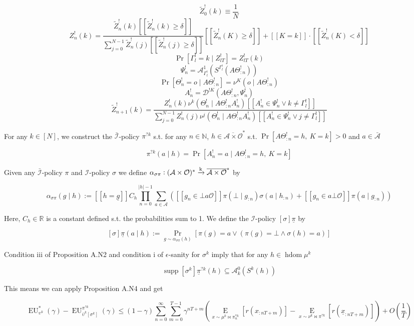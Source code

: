 \documentclass[a4paper]{article}
\DeclareMathOperator{\Supp}{supp}
\newcommand{\E}[1]{\underset{#1}{\operatorname{E}}}
\newcommand{\Nats}{\mathbb{N}}
\newcommand{\Reals}{\mathbb{R}}
\newcommand{\Abs}[1]{\lvert #1 \rvert}
\newcommand{\M}{\xrightarrow{\textnormal{k}}}
\newcommand{\Ob}{\mathcal{O}}
\newcommand{\A}{\mathcal{A}}
\newcommand{\In}{\mathcal{I}}
\newcommand{\FH}{(\A \times \Ob)^*}
\newcommand{\Ada}{\bar{\A}}
\newcommand{\Adi}{{\bar{\In}}}
\newcommand{\Adao}{\overline{\A \times \Ob}}
\newcommand{\Adfh}{\Adao^*}
\DeclareMathOperator{\HD}{hdom}
\newcommand{\EU}{\operatorname{EU}}
\newcommand{\D}{\mathcal{D}}
\newcommand{\Z}{Z}
\begin{document}
$$\tilde{\Z}^!_0(k)\equiv\frac{1}{N}$$
%
$$\Z_{n}^!(k) = \frac{\tilde{\Z}^!_{n}(k)[[\tilde{\Z}^!_{n}(k) \geq \delta]] }{\sum_{j = 0}^{N-1}\tilde{\Z}^!_{n}(j)[[\tilde{\Z}^!_{n}(j) \geq \delta]]}[[\tilde{\Z}^!_{n}(K) \geq \delta]] + [[K = k]]\cdot [[\tilde{\Z}^!_{n}(K) < \delta]]$$
%
$$\Pr\left[\Gamma^!_{l} = k \mid Z^!_{lT}\right] = \Z^!_{lT}\left(k\right)$$
%
$$\Psi^!_{n} = \A^1_{\Gamma^!_l}\left(S^{\Gamma^!_l}(A\Theta^!_{:n})\right)$$
%
$$\Pr\left[\Theta^!_{n} = o \mid A\Theta^!_{:n}\right] = \nu^K\left(o \mid A\Theta^!_{:n}\right)$$
%
$$A^!_n = \D^{!K}\left(A\Theta^!_{:n}, \Psi^!_n\right)$$
%
$$\tilde{\Z}^!_{n+1}(k)=\frac{\Z^!_{n}(k) \nu^k\left(\Theta^!_{n} \mid A\Theta^!_{:n}A_{n}^!\right)[[A^!_{n} \in \Psi^!_{n} \lor k \ne \Gamma^!_l]]}{\sum_{j = 0}^{N-1} \Z^!_n(j) \nu^j(\Theta^!_n \mid A\Theta^!_{:n}A^!_n)[[A^!_{n} \in \Psi^!_{n} \lor j \ne \Gamma^!_l]]}$$

For any $k \in [N]$, we construct the $\Adi$-policy $\pi^{?k}$ s.t. for any $n \in \Nats$, $h \in \Adfh$ s.t. $\Pr\left[A\Theta^!_{:n}=h,\ K = k\right] > 0$ and $a \in \Ada$

$$\pi^{?k}(a \mid h)=\Pr\left[A^!_n = a \mid A\Theta^!_{:n} = h,\ K = k\right]$$

Given any $\Adi$-policy $\pi$ and $\In$-policy $\sigma$ we define $\alpha_{\sigma\pi}: \FH \M \Adfh$ by

$$\alpha_{\sigma\pi} (g \mid h) := [[h = \underline{g}]]C_h\prod_{n = 0}^{\Abs{h}-1} \sum_{a \in \A}\left([[g_n \in \bot a\Ob]] \pi\left(\bot \mid g_{:n}\right)\sigma\left(a \mid h_{:n}\right)+[[g_n \in a\bot\Ob]]\pi\left(a \mid g_{:n}\right)\right)$$

Here, $C_h \in \Reals$ is a constant defined s.t. the probabilities sum to 1. We define the $\In$-policy $\left[\sigma\right]\underline{\pi}$ by

$$\left[\sigma\right]\underline{\pi}(a \mid h):=\Pr_{g \sim \alpha_{\sigma\pi}(h)}\left[\pi\left(g\right)=a \lor \left(\pi\left(g\right)=\bot \land \sigma(h)=a\right)\right]$$

Condition iii of Proposition A.N2 and condition i of $\epsilon$-sanity for $\sigma^k$ imply that for any $h \in \HD{\mu^k}$

$$\Supp{\left[\sigma^k\right]\underline{\pi}^{?k}(h)} \subseteq \A^0_k\left(S^k\left(h\right)\right)$$

This means we can apply Proposition A.N4 and get

$$\EU^*_{\upsilon^k}(\gamma)-\EU^{\pi^{?k}}_{\bar{\upsilon}^k[\sigma^k]}(\gamma) \leq (1-\gamma)\sum_{n=0}^\infty \sum_{m=0}^{T-1} \gamma^{nT+m}\left(\E{x\sim\mu^k\bowtie\pi^{*k}_n}\left[r\left(x_{:nT+m}\right)\right]-\E{x\sim\nu^k\bowtie\pi^{?k}}\left[r\left(\underline{x}_{:nT+m}\right)\right]\right) + O\left(\frac{1}{T}\right)$$
\end{document}
